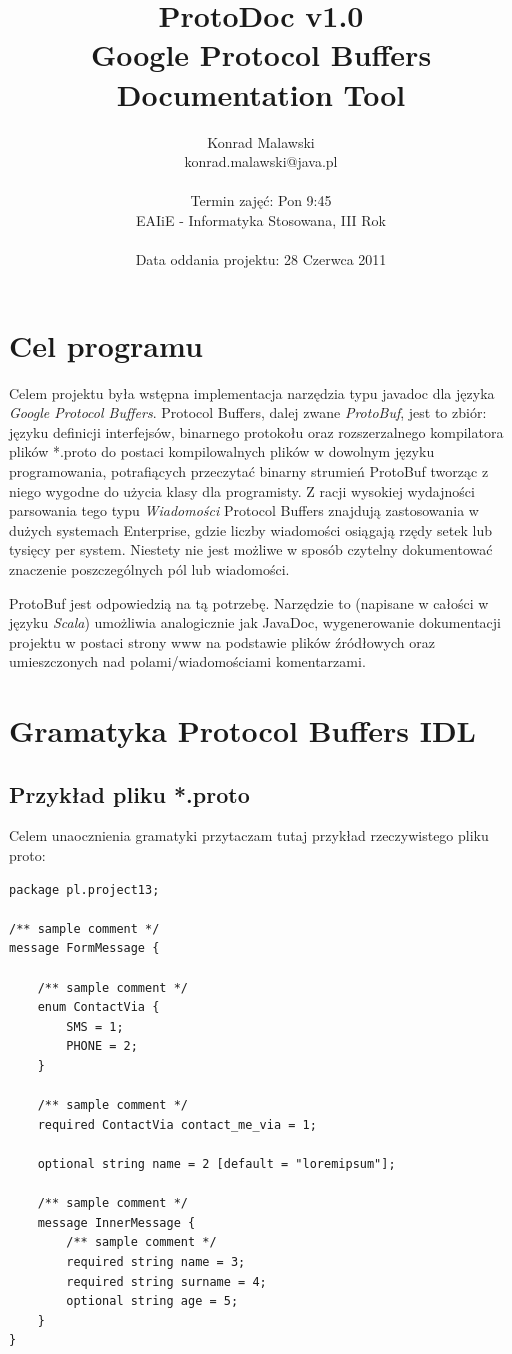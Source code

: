 \documentclass[a4paper]{article}
\title{
	\textbf{ProtoDoc} v1.0 \\
	Google Protocol Buffers Documentation Tool\\ 
}
\author{
	Konrad Malawski \\
	konrad.malawski@java.pl \\
	\\ 
	Termin zajęć: Pon 9:45 \\
	EAIiE - Informatyka Stosowana, III Rok \\
	\\
	Data oddania projektu: 28 Czerwca 2011
}
\begin{document}
\maketitle

\newpage
\tableofcontents

\newpage

\section{Cel programu}
Celem projektu była wstępna implementacja narzędzia typu javadoc dla języka \textit{Google Protocol Buffers}.
Protocol Buffers, dalej zwane \textit{ProtoBuf}, jest to zbiór: języku definicji interfejsów, binarnego protokołu oraz rozszerzalnego kompilatora plików *.proto
do postaci kompilowalnych plików w dowolnym języku programowania, potrafiących przeczytać binarny strumień ProtoBuf tworząc z niego wygodne do użycia klasy dla programisty.
Z racji wysokiej wydajności parsowania tego typu \textit{Wiadomości} Protocol Buffers znajdują zastosowania w dużych systemach Enterprise, gdzie liczby wiadomości
osiągają rzędy setek lub tysięcy per system. Niestety nie jest możliwe w sposób czytelny dokumentować znaczenie poszczególnych pól lub wiadomości.

ProtoBuf jest odpowiedzią na tą potrzebę. Narzędzie to (napisane w całości w języku \textit{Scala}) umożliwia analogicznie jak JavaDoc, 
wygenerowanie dokumentacji projektu w postaci strony www na podstawie plików źródłowych oraz umieszczonych nad polami/wiadomościami komentarzami.

\section{Gramatyka Protocol Buffers IDL}
\subsection{Przykład pliku *.proto}
Celem unaocznienia gramatyki przytaczam tutaj przykład rzeczywistego pliku proto:
\begin{lstlisting}
package pl.project13;

/** sample comment */
message FormMessage {

    /** sample comment */
    enum ContactVia {
        SMS = 1;
        PHONE = 2;
    }

    /** sample comment */
    required ContactVia contact_me_via = 1;

    optional string name = 2 [default = "loremipsum"];

    /** sample comment */
    message InnerMessage {
        /** sample comment */
        required string name = 3;
        required string surname = 4;
        optional string age = 5;
    }
} 
\end{lstlisting}
\end{document}
